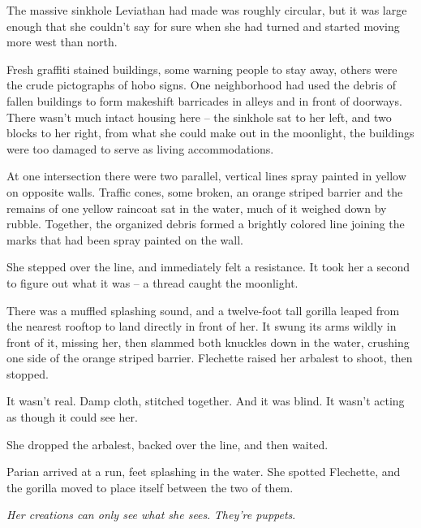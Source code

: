 The massive sinkhole Leviathan had made was roughly circular, but it was large enough that she couldn't say for sure when she had turned and started moving more west than north.



Fresh graffiti stained buildings, some warning people to stay away, others were the crude pictographs of hobo signs.  One neighborhood had used the debris of fallen buildings to form makeshift barricades in alleys and in front of doorways.  There wasn't much intact housing here – the sinkhole sat to her left, and two blocks to her right, from what she could make out in the moonlight, the buildings were too damaged to serve as living accommodations.



At one intersection there were two parallel, vertical lines spray painted in yellow on opposite walls.  Traffic cones, some broken, an orange striped barrier and the remains of one yellow raincoat sat in the water, much of it weighed down by rubble.  Together, the organized debris formed a brightly colored line joining the marks that had been spray painted on the wall.



She stepped over the line, and immediately felt a resistance.  It took her a second to figure out what it was – a thread caught the moonlight.



There was a muffled splashing sound, and a twelve-foot tall gorilla leaped from the nearest rooftop to land directly in front of her.  It swung its arms wildly in front of it, missing her, then slammed both knuckles down in the water, crushing one side of the orange striped barrier.  Flechette raised her arbalest to shoot, then stopped.



It wasn't real.  Damp cloth, stitched together.  And it was blind.  It wasn't acting as though it could see her.



She dropped the arbalest, backed over the line, and then waited.



Parian arrived at a run, feet splashing in the water.  She spotted Flechette, and the gorilla moved to place itself between the two of them.



\emph{Her creations can only see what she sees}.  \emph{They're puppets}.



